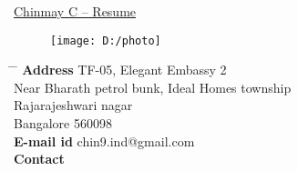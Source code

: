 \documentclass[10pt]{article}
\begin{document}
	
\begin{tabbing}
	\hspace{1cm}
	\underline{\LARGE{Chinmay C -- Resume}} %
\end{tabbing}

	\begin{figure}[h]
		\texttt{[image: D:/photo]}
	\end{figure}
	
\parbox{1.5\textwidth}{ %
	\begin{tabbing} %
		\hspace{3cm} \= \hspace{4cm} \= \kill %
		{\bf Address} \> TF-05, Elegant Embassy 2\\ %
		\> Near Bharath petrol bunk, Ideal Homes township\\ %
		\> Rajarajeshwari nagar\\ %
		\> Bangalore 560098\\ %
		{\bf E-mail id} \> chin9.ind@gmail.com  \\ %
		{\bf Contact}   \\ %
	\end{tabbing}}
	\hfill\\
	\hfill\\
	\hfill %
	
\end{document}

